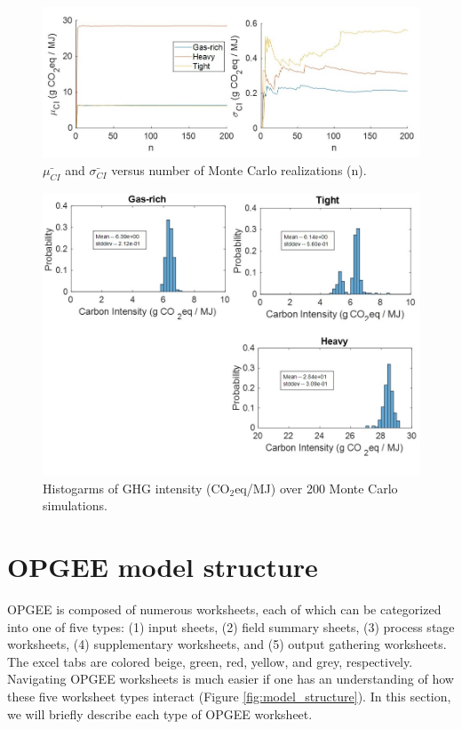 \documentclass[11pt]{report}
\begin{document}
\begin{figure}[!htbp]
\includegraphics[width=1\columnwidth]{documentation/images/User_Guide_figs/uncertaintyresults_2.jpg}
\caption{$\bar{\mu_{CI}}$ and $\bar{\sigma_{CI}}$ versus number of Monte Carlo realizations (n).}
\label{fig:example_uncertainty}
\end{figure}

\begin{figure}[!htbp]
\includegraphics[width=1\columnwidth]{documentation/images/User_Guide_figs/histos.jpg}
\caption{Histogarms of GHG intensity (CO$_2$eq/MJ) over 200 Monte Carlo simulations.}
\label{fig:example_uncertainty}
\end{figure}

\clearpage

\section{OPGEE model structure}
\label{sec:model_structure}

OPGEE is composed of numerous worksheets, each of which can be categorized into one of five types: (1) input sheets, (2) field summary sheets, (3) process stage worksheets, (4) supplementary worksheets, and (5) output gathering worksheets. The excel tabs are colored beige, green, red, yellow, and grey, respectively. Navigating OPGEE worksheets is much easier if one has an understanding of how these five worksheet types interact (Figure \ref{fig:model_structure}). In this section, we will briefly describe each type of OPGEE worksheet.
\end{document}
